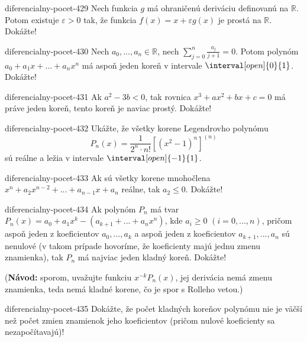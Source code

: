 \begin{defproblem}{diferencialny-pocet-429}
Nech funkcia $g$ má ohraničenú deriváciu definovanú na $\mathbb{R}$. Potom
existuje $\varepsilon >0$ tak, že funkcia $f(x)=x+\varepsilon g(x)$ je prostá na
$\mathbb{R}$. Dokážte!
\end{defproblem}

\begin{defproblem}{diferencialny-pocet-430}
Nech $a_0,...,a_n\in\mathbb{R}$, nech $\sum_{j=0}^n\frac{a_j}{j+1}=0$. Potom
polynóm $a_0+a_1x+...+a_nx^n$ má aspoň jeden koreň v intervale
$\interval[open]{0}{1}$. Dokážte!
\end{defproblem}

\begin{defproblem}{diferencialny-pocet-431}
Ak $a^2-3b<0$, tak rovnica $x^3+ax^2+bx+c=0$ má práve jeden koreň, tento koreň
je naviac prostý. Dokážte!
\end{defproblem}

\begin{defproblem}{diferencialny-pocet-432}
Ukážte, že všetky korene Legendrovho polynómu
\[
  P_n(x)=\frac{1}{2^n\cdot n!}[(x^2-1)^n]^{(n)}
\]
sú reálne a ležia v intervale $\interval[open]{-1}{1}$.
\end{defproblem}

\begin{defproblem}{diferencialny-pocet-433}
Ak sú všetky korene mnohočlena $x^n+a_2x^{n-2}+...+a_{n-1}x+a_n$ reálne, tak
$a_2\leq 0$. Dokážte!
\end{defproblem}

\begin{defproblem}{diferencialny-pocet-434}
Ak polynóm $P_n$ má tvar $P_n(x)=a_0+a_1x^k-(a_{k+1}+...+a_nx^{n})$, kde $a_i
\geq 0$ $(i=0,...,n)$, pričom aspoň jeden z koeficientov $a_0,...,a_k$ a aspoň
jeden z koeficientov $a_{k+1},...,a_n$ sú nenulové (v takom prípade hovoríme, že
koeficienty majú jednu zmenu znamienka), tak $P_n$ má najviac jeden kladný
koreň. Dokážte!

(\textbf{Návod:} sporom, uvažujte funkciu $x^{-k}P_n(x)$, jej derivácia nemá
zmenu znamienka, teda nemá kladné korene, čo je spor s Rolleho vetou.)
\end{defproblem}

\begin{defproblem}{diferencialny-pocet-435}
Dokážte, že počet kladných koreňov polynómu nie je väčší než počet zmien
znamienok jeho koeficientov (pričom nulové koeficienty sa nezapočítavajú)!
\end{defproblem}


